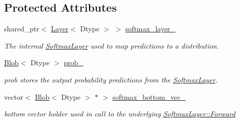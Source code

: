 \subsection*{Protected Attributes}
\begin{DoxyCompactItemize}
\item 
\mbox{\label{classcaffe_1_1_softmax_with_loss_layer_a99288fd74c65097b13fb2c18baf2944a}} 
shared\+\_\+ptr$<$ \mbox{\hyperlink{classcaffe_1_1_layer}{Layer}}$<$ Dtype $>$ $>$ \mbox{\hyperlink{classcaffe_1_1_softmax_with_loss_layer_a99288fd74c65097b13fb2c18baf2944a}{softmax\+\_\+layer\+\_\+}}
\begin{DoxyCompactList}\small\item\em The internal \mbox{\hyperlink{classcaffe_1_1_softmax_layer}{Softmax\+Layer}} used to map predictions to a distribution. \end{DoxyCompactList}\item 
\mbox{\label{classcaffe_1_1_softmax_with_loss_layer_ac088354702f96c8d63f0d978e314d5dd}} 
\mbox{\hyperlink{classcaffe_1_1_blob}{Blob}}$<$ Dtype $>$ \mbox{\hyperlink{classcaffe_1_1_softmax_with_loss_layer_ac088354702f96c8d63f0d978e314d5dd}{prob\+\_\+}}
\begin{DoxyCompactList}\small\item\em prob stores the output probability predictions from the \mbox{\hyperlink{classcaffe_1_1_softmax_layer}{Softmax\+Layer}}. \end{DoxyCompactList}\item 
\mbox{\label{classcaffe_1_1_softmax_with_loss_layer_a186afeee3669b5b8bc3bcae58238c0a9}} 
vector$<$ \mbox{\hyperlink{classcaffe_1_1_blob}{Blob}}$<$ Dtype $>$ $\ast$ $>$ \mbox{\hyperlink{classcaffe_1_1_softmax_with_loss_layer_a186afeee3669b5b8bc3bcae58238c0a9}{softmax\+\_\+bottom\+\_\+vec\+\_\+}}
\begin{DoxyCompactList}\small\item\em bottom vector holder used in call to the underlying \mbox{\hyperlink{classcaffe_1_1_layer_ab57d272dabe8c709d2a785eebe72ca57}{Softmax\+Layer\+::\+Forward}} \end{DoxyCompactList}\item 
\mbox{\label{classcaffe_1_1_softmax_with_loss_layer_af8c7d82864973c19f3999325e09fd52c}} 

\end{DoxyCompactItemize}
